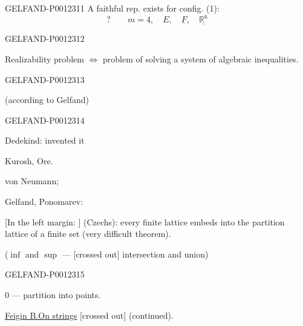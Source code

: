 \begin{GelfandAdjacentEvidence}{GELFAND-P001231}{1}
A faithful rep. exists for config. (1):
\begin{equation*}
?\qquad m=4,\quad E,\quad \underline F,\quad \underline{\mathbb R^6}
\end{equation*}
\end{GelfandAdjacentEvidence}
\begin{GelfandAdjacentEvidence}{GELFAND-P001231}{2}


Realizability problem \(\Leftrightarrow\) problem of solving a system of algebraic inequalities.
\end{GelfandAdjacentEvidence}
\begin{GelfandAdjacentEvidence}{GELFAND-P001231}{3}


 (according to Gelfand)
\end{GelfandAdjacentEvidence}
\begin{GelfandAdjacentEvidence}{GELFAND-P001231}{4}


Dedekind: invented it

Kurosh, Ore.

von Neumann;

Gelfand, Ponomarev:

[In the left margin: ]
 (Czechs): every finite lattice embeds into the partition lattice of a finite set (very difficult theorem).

(\(\inf\) and \(\sup\) --- [crossed out] intersection and union)
\end{GelfandAdjacentEvidence}
\begin{GelfandAdjacentEvidence}{GELFAND-P001231}{5}


\(0\) --- partition into points.

\medskip
\underline{\underline{Feigin B.}}\qquad\underline{On strings} [crossed out] (continued).
\end{GelfandAdjacentEvidence}
